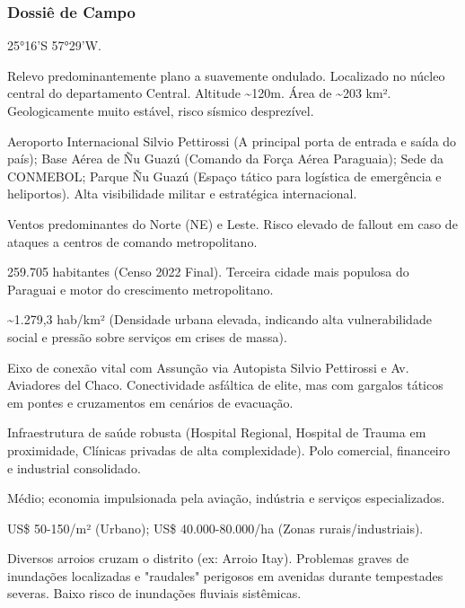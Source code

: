 \subsubsection{Dossiê de Campo}
\begin{description}[style=nextline,leftmargin=0.5cm,font=\bfseries]
\item[Coordenadas]  25°16'S 57°29'W.
\item[Topografia]  Relevo predominantemente plano a suavemente ondulado. Localizado no núcleo central do departamento Central. Altitude \textasciitilde 120m. Área de \textasciitilde 203 km². Geologicamente muito estável, risco sísmico desprezível.
\item[Alvos Estratégicos]  Aeroporto Internacional Silvio Pettirossi (A principal porta de entrada e saída do país); Base Aérea de Ñu Guazú (Comando da Força Aérea Paraguaia); Sede da CONMEBOL; Parque Ñu Guazú (Espaço tático para logística de emergência e heliportos). Alta visibilidade militar e estratégica internacional.
\item[Fallout]  Ventos predominantes do Norte (NE) e Leste. Risco elevado de fallout em caso de ataques a centros de comando metropolitano.
\item[População]  259.705 habitantes (Censo 2022 Final). Terceira cidade mais populosa do Paraguai e motor do crescimento metropolitano.
\item[Densidade]  \textasciitilde 1.279,3 hab/\allowbreak km² (Densidade urbana elevada, indicando alta vulnerabilidade social e pressão sobre serviços em crises de massa).
\item[Vias de Acesso]  Eixo de conexão vital com Assunção via Autopista Silvio Pettirossi e Av. Aviadores del Chaco. Conectividade asfáltica de elite, mas com gargalos táticos em pontes e cruzamentos em cenários de evacuação.
\item[Serviços]  Infraestrutura de saúde robusta (Hospital Regional, Hospital de Trauma em proximidade, Clínicas privadas de alta complexidade). Polo comercial, financeiro e industrial consolidado.
\item[Custo de Vida]  Médio; economia impulsionada pela aviação, indústria e serviços especializados.
\item[Preço da Terra]  US\$ 50-150/\allowbreak m² (Urbano); US\$ 40.000-80.000/\allowbreak ha (Zonas rurais/\allowbreak industriais).
\item[Hidrologia]  Diversos arroios cruzam o distrito (ex: Arroio Itay). Problemas graves de inundações localizadas e "raudales" perigosos em avenidas durante tempestades severas. Baixo risco de inundações fluviais sistêmicas.

\end{description}
